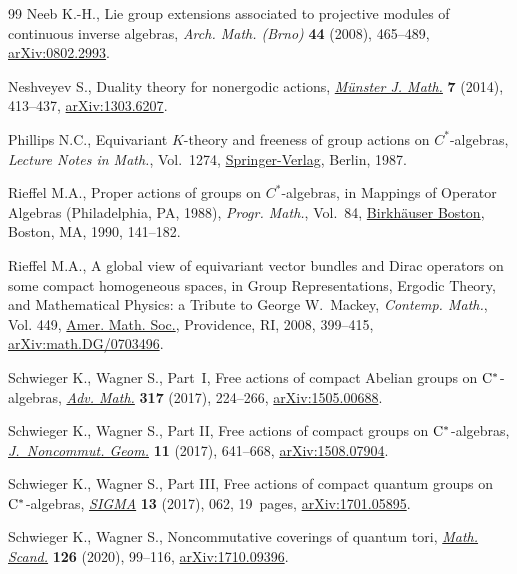 \begin{thebibliography}{99}
Neeb K.-H., Lie group extensions associated to projective modules of continuous
 inverse algebras, \textit{Arch. Math. (Brno)} \textbf{44} (2008), 465--489,
 \href{https://arxiv.org/abs/0802.2993}{arXiv:0802.2993}.

Neshveyev S., Duality theory for nonergodic actions, \href{https://doi.org/10.17879/58269764511}{\textit{M\"unster J.
 Math.}} \textbf{7} (2014), 413--437, \href{https://arxiv.org/abs/1303.6207}{arXiv:1303.6207}.

Phillips N.C., Equivariant {$K$}-theory and freeness of group actions on
 {$C^*$}-algebras, \textit{Lecture Notes in Math.}, Vol.~1274,
 \href{https://doi.org/10.1007/BFb0078657}{Springer-Verlag}, Berlin, 1987.

Rieffel M.A., Proper actions of groups on {$C^*$}-algebras, in Mappings of
 Operator Algebras ({P}hiladelphia, {PA}, 1988), \textit{Progr. Math.},
 Vol.~84, \href{https://doi.org/10.1007/978-1-4612-0453-4_6}{Birkh\"auser Boston}, Boston, MA, 1990, 141--182.

Rieffel M.A., A global view of equivariant vector bundles and {D}irac operators
 on some compact homogeneous spaces, in Group Representations, Ergodic Theory,
 and Mathematical Physics: a Tribute to {G}eorge {W}.~{M}ackey,
 \textit{Contemp. Math.}, Vol. 449, \href{https://doi.org/10.1090/conm/449/08721}{Amer. Math. Soc.}, Providence, RI, 2008,
 399--415, \href{https://arxiv.org/abs/math.DG/0703496}{arXiv:math.DG/0703496}.

Schwieger K., Wagner S., Part~{I}, {F}ree actions of compact {A}belian groups
 on {${\rm C}^*$}-algebras, \href{https://doi.org/10.1016/j.aim.2017.06.036}{\textit{Adv. Math.}} \textbf{317} (2017), 224--266,
 \href{https://arxiv.org/abs/1505.00688}{arXiv:1505.00688}.

Schwieger K., Wagner S., Part {II}, {F}ree actions of compact groups on {$\rm
 C^*$}-algebras, \href{https://doi.org/10.4171/JNCG/11-2-6}{\textit{J.~Noncommut. Geom.}} \textbf{11} (2017), 641--668,
 \href{https://arxiv.org/abs/#2}{arXiv:1508.07904}.

Schwieger K., Wagner S., Part {III}, {F}ree actions of compact quantum groups
 on {${\rm C}^*$}-algebras, \href{https://doi.org/10.3842/SIGMA.2017.062}{\textit{SIGMA}} \textbf{13} (2017), 062, 19~pages,
 \href{https://arxiv.org/abs/1701.05895}{arXiv:1701.05895}.

Schwieger K., Wagner S., Noncommutative coverings of quantum tori,
 \href{https://doi.org/10.7146/math.scand.a-116147}{\textit{Math. Scand.}} \textbf{126} (2020), 99--116, \href{https://arxiv.org/abs/1710.09396}{arXiv:1710.09396}.


\end{thebibliography}
